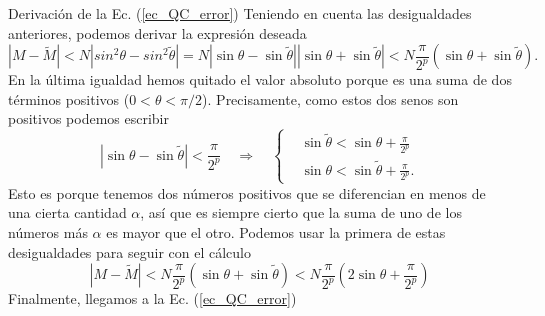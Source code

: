 \documentclass[a4paper,11pt]{article} %
\numberwithin{equation}{section}
\def\lp{\left(}
\def\rp{\right)}
\def\lch{\left\{}
\def\rqa{\quad \Rightarrow \quad}
\begin{document}
	\begin{mybox_green}{Derivación de la Ec. (\ref{ec_QC_error})}
	Teniendo en cuenta las desigualdades anteriores, podemos derivar la expresión deseada
	\begin{equation*}
	|M - \tilde{M}|  < N \left| sin^2 \theta - sin^2 \tilde{\theta}  \right|  =   
	N \left| \sin \theta -  \sin \tilde{\theta} \right| 
	\left| \sin \theta + \sin \tilde{\theta} \right|   < 
	N \frac{\pi}{2^p} \lp \sin \theta + \sin \tilde{\theta} \rp.
	\end{equation*}
	En la última igualdad hemos quitado el valor absoluto porque es una suma de dos 
	términos positivos ($0 < \theta < \pi/2$). Precisamente, como estos dos senos son 
	positivos podemos escribir
	\begin{equation*}
	\left| \sin \theta - \sin \tilde{\theta} \right| < \frac{\pi}{2^p} \rqa
	\lch \begin{matrix}
		& \sin \tilde{\theta} <  \sin \theta + \frac{\pi}{2^p} \\
		& \sin \theta <  \sin \tilde{\theta} + \frac{\pi}{2^p} .
	\end{matrix} \right. 
	\end{equation*}
	Esto es porque tenemos dos números positivos que se diferencian en menos de una cierta 
	cantidad $\alpha$, así que es siempre cierto que la suma de uno de los números más 
	$\alpha$ es mayor que el otro. Podemos usar la primera de estas desigualdades para 
	seguir con el cálculo
	\begin{equation}
	|M - \tilde{M}|  < N \frac{\pi}{2^p} \lp \sin \theta + \sin \tilde{\theta}  \rp < 
	N \frac{\pi}{2^p} \lp 2 \sin \theta +\frac{\pi}{2^p} \rp
	\end{equation}
	Finalmente, llegamos a la Ec. (\ref{ec_QC_error})
	\end{mybox_green}
\end{document}
